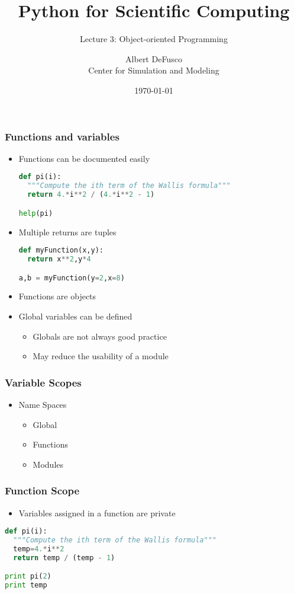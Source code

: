 \documentclass[xcolor=table,10pt,final]{beamer}
\begin{document}
\title{Python for Scientific Computing}
\subtitle{Lecture 3: Object-oriented Programming}
\author{Albert DeFusco\\Center for Simulation and Modeling}
\date{\today}


\frame{\titlepage}


\begin{frame}[fragile]
  \frametitle{Functions and variables}
  \begin{itemize}
    \item Functions can be documented easily\\
      \begin{lstlisting}[language=Python]
def pi(i):
  """Compute the ith term of the Wallis formula"""
  return 4.*i**2 / (4.*i**2 - 1)

help(pi)
      \end{lstlisting}
    \item Multiple returns are tuples\\
      \begin{lstlisting}[language=Python]
def myFunction(x,y):
  return x**2,y*4

a,b = myFunction(y=2,x=8)
      \end{lstlisting}
    \item Functions are objects
    \item Global variables can be defined
      \begin{itemize}
        \item Globals are not always good practice
        \item May reduce the usability of a module
      \end{itemize}
  \end{itemize}
\end{frame}

\begin{frame}
  \frametitle{Variable Scopes}
  \begin{itemize}
    \item Name Spaces
      \begin{itemize}
        \item Global
        \item Functions
        \item Modules
      \end{itemize}
  \end{itemize}
\end{frame}

\begin{frame}[fragile]
  \frametitle{Function Scope}
  \begin{itemize}
    \item Variables assigned in a function are private
  \end{itemize}
\begin{lstlisting}[language=Python]
def pi(i):
  """Compute the ith term of the Wallis formula"""
  temp=4.*i**2
  return temp / (temp - 1)

print pi(2)
print temp
\end{lstlisting}
\end{frame}
\end{document}
